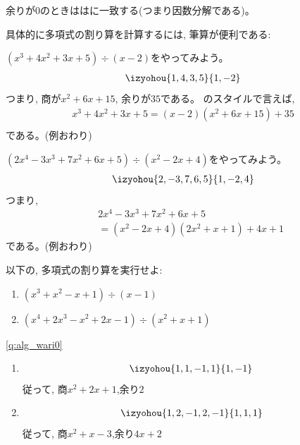 余りが0のときははに一致する(つまり因数分解である)。

具体的に多項式の割り算を計算するには, 筆算が便利である:

\begin{exmpl}\label{ex:poly2} $(x^3+4x^2+3x+5)\div(x-2)$をやってみよう。
\begin{eqnarray*}
\izyohou{1,4,3,5}{1,-2}
\end{eqnarray*}
つまり, 商が$x^2+6x+15$, 余りが$35$である。
のスタイルで言えば, 
\begin{eqnarray}
x^3+4x^2+3x+5=(x-2)(x^2+6x+15)+35\nonumber\\
\label{eq:exm_pol_div_35}\end{eqnarray}
である。(例おわり)\end{exmpl}\hv

\begin{exmpl} $(2x^4-3x^3+7x^2+6x+5)\div(x^2-2x+4)$をやってみよう。
\begin{eqnarray*}
\izyohou{2,-3,7,6,5}{1,-2,4}
\end{eqnarray*}
つまり, 
\begin{eqnarray*}
&&2x^4-3x^3+7x^2+6x+5\\
&&=(x^2-2x+4)(2x^2+x+1)+4x+1
\end{eqnarray*}
である。(例おわり)\end{exmpl}\hv

\begin{q}\label{q:alg_wari0}
 以下の, 多項式の割り算を実行せよ:
\begin{enumerate}
\item $(x^3 + x^2 -x + 1) \div (x-1)$
\item $(x^4 + 2x^3 -x^2 + 2x - 1) \div (x^2 + x + 1)$
\end{enumerate}
\end{q}
\vspace{0.3cm}


\ref{q:alg_wari0}  
\begin{enumerate}
\item 
\begin{eqnarray*}\izyohou{1,1,-1,1}{1,-1}\end{eqnarray*}
従って, 商$x^2 + 2x + 1$,余り$2$
\item 
\begin{eqnarray*}\izyohou{1,2,-1,2,-1}{1,1,1}\end{eqnarray*}
従って, 商$x^2 + x -3$,余り$4x+2$
\end{enumerate}
\hv


